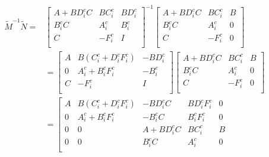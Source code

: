 \documentclass[a4paper,fleqn]{cas-sc}
\begin{document}
\begin{equation}
  \begin{aligned}
    \tilde{M}^{-1} \tilde{N}=
     & \left[\begin{array}{cc|c}
        A+B D_{i}^{c} C & B    C_{i}^{c} & B    D_{i}^{c} \\
        B_{i}^{c}   C   & A_{i}^{c}      & B_{i}^{c}      \\
        \hline   C      & -F_{i}^{c}     & I              \\
      \end{array}\right]^{-1} \left[\begin{array}{cc|c}
        A+B    D_{i}^{c} C & B    C_{i}^{c} & B \\
        B_{i}^{c}   C      & A_{i}^{c}      & 0 \\
        \hline    C        & -F_{i}^{c}     & 0 \\
      \end{array}\right] \\
     & =\left[\begin{array}{cc|c}
        A          & B    (C_{i}^{c}+D_{i}^{c}F_{i}^{c}) & -B    D_{i}^{c} \\
        0          & A_{i}^{c}+B_{i}^{c}  F_{i}^{c}      & -B_{i}^{c}      \\
        \hline   C & -F_{i}^{c}                          & I               \\
      \end{array}\right]  \left[\begin{array}{cc|c}
        A+B    D_{i}^{c} C & B    C_{i}^{c} & B \\
        B_{i}^{c}   C      & A_{i}^{c}      & 0 \\
        \hline    C        & -F_{i}^{c}     & 0 \\
      \end{array}\right]    \\
     & =\left[\begin{array}{cccc|c}
        A          & B    (C_{i}^{c}+D_{i}^{c}F_{i}^{c}) & -B    D_{i}^{c}C   & B    D_{i}^{c}F_{i}^{c} & 0 \\
        0          & A_{i}^{c}+B_{i}^{c}   F_{i}^{c}     & -B_{i}^{c}  C      & B_{i}^{c}  F_{i}^{c}    & 0 \\
        0          & 0                                   & A+B    D_{i}^{c} C & B    C_{i}^{c}          & B \\
        0          & 0                                   & B_{i}^{c}   C      & A_{i}^{c}               & 0 \\

\end{array}
\end{aligned}
\end{equation}
\end{document}
